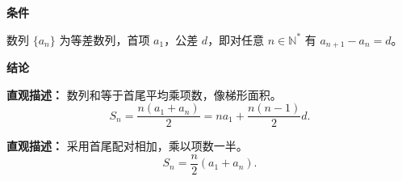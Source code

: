 \begin{statementbox}

\textbf{\textcolor{CStatement}{条件}}
\begin{description}[style=nextline, leftmargin=2.8em, labelsep=0.5em, itemsep=0.35em]
    \item[\textbf{\textcolor{CStatement}{条件 1（等差数列定义）：}}] 数列 $\{a_n\}$ 为等差数列，首项 $a_1$，公差 $d$，即对任意 $n\in\mathbb{N}^*$ 有 $a_{n+1}-a_n=d$。
\end{description}

\textbf{\textcolor{CStatement}{结论}}
\begin{description}[style=nextline, leftmargin=2.8em, labelsep=0.5em, itemsep=0.45em]
    \item[\textbf{\textcolor{CStatement}{结论一（前n项和公式）：}}]
    \textbf{\textcolor{CStatement}{直观描述：}} 数列和等于首尾平均乘项数，像梯形面积。
    \[
    S_n = \frac{n(a_1+a_n)}{2} = na_1 + \frac{n(n-1)}{2}d .
    \]

    \item[\textbf{\textcolor{CStatement}{推广结论（倒序相加形式）：}}]
    \textbf{\textcolor{CStatement}{直观描述：}} 采用首尾配对相加，乘以项数一半。
    \[
    S_n = \frac{n}{2}(a_1 + a_n) .
    \]
\end{description}

\end{statementbox}
